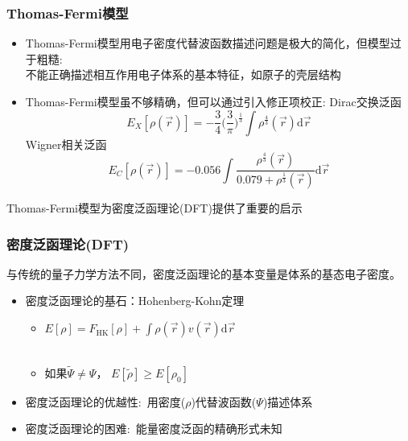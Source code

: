 \frame
{
	\frametitle{\textrm{Thomas-Fermi}模型}
	\begin{itemize}
		\item \textrm{Thomas-Fermi}模型用电子密度代替波函数描述问题是极大的简化，但模型过于粗糙:\\
			不能正确描述相互作用电子体系的基本特征，如原子的壳层结构
		\item \textrm{Thomas-Fermi}模型虽不够精确，但可以通过引入修正项校正:
			\textrm{Dirac}交换泛函 $$E_X[\rho(\vec r)]=-\dfrac34\bigg(\dfrac3{\pi}\bigg)^{\frac13}\int\rho^{\frac43}(\vec r)\mathrm{d}\vec r$$
			\textrm{Wigner}相关泛函 $$E_C[\rho(\vec r)]=-0.056\int\dfrac{\rho^{\frac43}(\vec r)}{0.079+\rho^{\frac13}(\vec r)}\mathrm{d}\vec r$$
	\end{itemize}
	\textrm{Thomas-Fermi}模型为密度泛函理论\textrm{(DFT)}提供了重要的启示
}

\frame                               %
{
\frametitle{密度泛函理论(\textrm{DFT})} %
与传统的量子力学方法不同，密度泛函理论的基本变量是体系的基态电子密度。%
\begin{itemize}%
	\item 密度泛函理论的基石：\textrm{Hohenberg-Kohn}定理
\vskip 5pt
\begin{itemize}%
   \setlength{\itemsep}{8pt}
 \item $E[\rho]=F_{\mathrm{HK}}[\rho]+\displaystyle\int\rho(\vec{r})v(\vec{r})\textrm{d}\vec{r}$ \\
\vskip 5pt 
{\fontsize{7.2pt}{6.2pt}}\\%
\textcolor{magenta}{\fontsize{8.2pt}{6.2pt}\selectfont{第一定理表明多电子体系的性质完全由体系的基态密度决定}}
   \item 如果$\tilde\Psi\neq\Psi$，
     $E[\tilde\rho]\geqslant E[\rho_0]$\\
     \textcolor{magenta}{\fontsize{8.2pt}{6.2pt}\selectfont{第二定理指出基态总能量泛函在体系基态电子密度处取极小值}}
   \end{itemize}
\vskip 8pt
 \item 密度泛函理论的优越性:~用密度($\rho$)代替波函数($\Psi$)描述体系
\vskip 5pt
 \item 密度泛函理论的困难:~能量密度泛函的精确形式未知
   \end{itemize}
}


